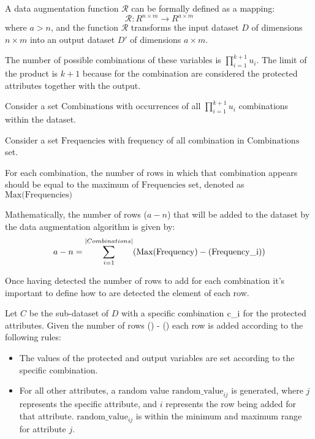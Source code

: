 A data augmentation function $\mathcal{R}$ can be formally defined as a mapping:
\[
\mathcal{R}: R^{n \times m} \rightarrow R^{a \times m}
\]
where $a > n$, and the function $\mathcal{R}$ transforms the input dataset $D$ of dimensions $n \times m$ into an output dataset $D'$ of dimensions $a \times m$.

The number of possible combinations of these variables is $\prod_{i=1}^{k+1} u_i$. The limit of the product is ${k + 1}$ because for the combination are considered the protected attributes together with the output.

Consider a set $\text{Combinations}$ with occurrences of all $\prod_{i=1}^{k+1} u_i$ combinations within the dataset. 

Consider a set $\text{Frequencies}$ with frequency of all combination in $\text{Combinations}$ set.

For each combination, the number of rows in which that combination appears should be equal to the maximum of $\text{Frequencies}$ set, denoted as $\text{Max(Frequencies)}$

Mathematically, the number of rows ($a - n$) that will be added to the dataset by the data augmentation algorithm is given by:
\[
a - n = \sum_{i=1}^{|Combinations|}(\text{Max}(\text{Frequency}) - (\text{Frequency\textunderscore i}))
\]

Once having detected the number of rows to add for each combination it's important to define how to are detected the element of each row.

Let $C$ be the sub-dataset of $D$ with a specific combination $\text{c\textunderscore i}$ for the protected attributes. Given the number of rows () - () each row is added according to the following rules:

\begin{itemize}
    
    \item The values of the protected and output variables are set according to the specific combination.
   
    \item For all other attributes, a random value $\text{random\_value}_{ij}$ is generated, where $j$ represents the specific attribute, and $i$ represents the row being added for that attribute. $\text{random\_value}_{ij}$ is within the minimum and maximum range for attribute $j$.

\end{itemize}


